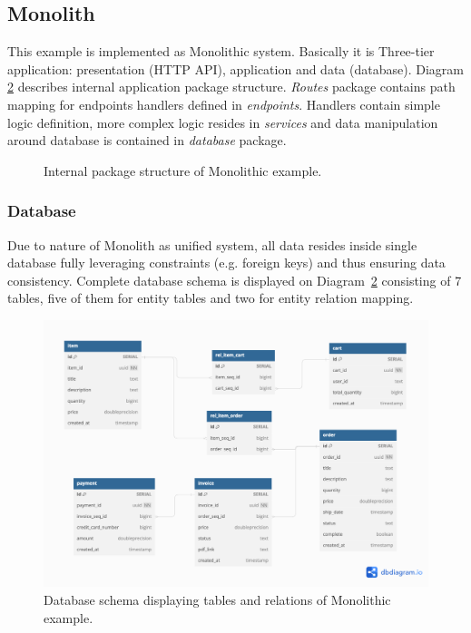 \subsection{Monolith}
This example is implemented as Monolithic system. Basically it is Three-tier application: presentation (HTTP API), application and data (database). Diagram \ref{img:monolith_db_schema} describes internal application package structure. \textit{Routes} package contains path mapping for endpoints handlers defined in \textit{endpoints}. Handlers contain simple logic definition, more complex logic resides in \textit{services} and data manipulation around database is contained in \textit{database} package.

\begin{figure}
    \centering
    
    \caption{Internal package structure of Monolithic example. \label{img:monolith_package}}
\end{figure}


\subsubsection{Database}
Due to nature of Monolith as unified system, all data resides inside single database fully leveraging constraints (e.g. foreign keys) and thus ensuring data consistency. Complete database schema is displayed on Diagram~\ref{img:monolith_db_schema} consisting of 7 tables, five of them for entity tables and two for entity relation mapping.

\begin{figure}
    \centering
    \includegraphics[width=\textwidth]{images/monolith_db_schema.png}
    \caption{Database schema displaying tables and relations of Monolithic example. \label{img:monolith_db_schema}}
\end{figure}



